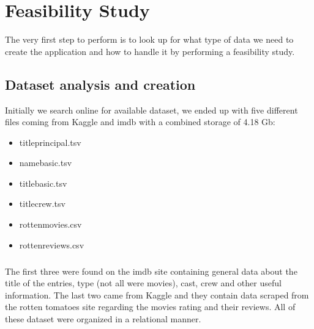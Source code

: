 %


%

\chapter{Feasibility Study}
\justifying
The very first step to perform is to look up for what type of data we need to create the application and how to handle it by performing a feasibility study.
\section{Dataset analysis and creation}
Initially we search online for available dataset, we ended up with five different files coming from Kaggle and imdb with a combined storage of 4.18 Gb:
\begin{itemize}
  \item title\textunderscore principal.tsv  
  \item name\textunderscore basic.tsv 
  \item title\textunderscore basic.tsv 
  \item title\textunderscore crew.tsv
  \item rotten\textunderscore movies.csv
  \item rotten\textunderscore reviews.csv 
\end{itemize} 
\paragraph{}
The first three were found on the imdb site containing general data about the title of the entries, type (not all were movies), cast, crew and other useful information. The last two came from Kaggle and they contain data scraped from the rotten tomatoes site regarding the movies rating and their reviews. All of these dataset were organized in a relational manner.
